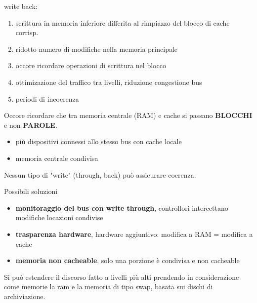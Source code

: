 \documentclass[12pt, a4paper]{article}
\begin{document}
\begin{defn}
write back:

\begin{enumerate}
	\item scrittura in memoria inferiore differita al rimpiazzo del blocco di cache corrisp.
	\item ridotto numero di modifiche nella memoria principale
	\item occore ricordare operazioni di scrittura nel blocco
	\item ottimizazione del traffico tra livelli, riduzione
		congestione bus
	\item periodi di incoerenza
\end{enumerate}
\end{defn}
Occore ricordare che tra memoria centrale (RAM) e cache si passano \textbf{BLOCCHI} e non \textbf{PAROLE}.



\begin{esem}
\begin{itemize}
	\item più dispositivi connessi allo stesso bus con cache locale
	\item memoria centrale condivisa
\end{itemize}
Nessun tipo di "write" (through, back) può assicurare coerenza.
\end{esem}
Possibili soluzioni



\begin{itemize}
	\item \textbf{monitoraggio del bus con write through}, controllori intercettano modifiche locazioni condivise
	\item \textbf{trasparenza hardware}, hardware aggiuntivo: modifica a RAM = modifica a cache
	\item \textbf{memoria non cacheable}, solo una porzione è condivisa e non cacheable
\end{itemize}
Si può estendere il discorso fatto a livelli più alti prendendo in considerazione come memorie la ram e la memoria di tipo swap, basata sui dischi di archiviazione. 
\end{document}
